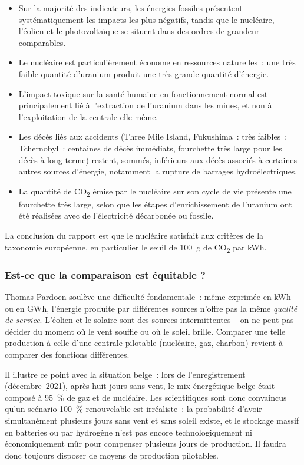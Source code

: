 \begin{itemize}
    \item Sur la majorité des indicateurs, les énergies fossiles présentent systématiquement les impacts les plus négatifs, tandis que le nucléaire, l'éolien et le photovoltaïque se situent dans des ordres de grandeur comparables.
    \item Le nucléaire est particulièrement économe en ressources naturelles~: une très faible quantité d'uranium produit une très grande quantité d'énergie.
    \item L'impact toxique sur la santé humaine en fonctionnement normal est principalement lié à l'extraction de l'uranium dans les mines, et non à l'exploitation de la centrale elle-même.
    \item Les décès liés aux accidents (Three Mile Island, Fukushima~: très faibles~; Tchernobyl~: centaines de décès immédiats, fourchette très large pour les décès à long terme) restent, sommés, inférieurs aux décès associés à certaines autres sources d'énergie, notamment la rupture de barrages hydroélectriques.
    \item La quantité de CO\textsubscript{2} émise par le nucléaire sur son cycle de vie présente une fourchette très large, selon que les étapes d'enrichissement de l'uranium ont été réalisées avec de l'électricité décarbonée ou fossile.
\end{itemize}

La conclusion du rapport est que le nucléaire satisfait aux critères de la taxonomie européenne, en particulier le seuil de 100~g de CO\textsubscript{2} par kWh.

\subsubsection{Est-ce que la comparaison est équitable ?}

Thomas Pardoen soulève une difficulté fondamentale~: même exprimée en kWh ou en GWh, l'énergie produite par différentes sources n'offre pas la même \emph{qualité de service}. L'éolien et le solaire sont des sources intermittentes -- on ne peut pas décider du moment où le vent souffle ou où le soleil brille. Comparer une telle production à celle d'une centrale pilotable (nucléaire, gaz, charbon) revient à comparer des fonctions différentes.

Il illustre ce point avec la situation belge~: lors de l'enregistrement (décembre~2021), après huit jours sans vent, le mix énergétique belge était composé à 95~\% de gaz et de nucléaire. Les scientifiques sont donc convaincus qu'un scénario 100~\% renouvelable est irréaliste~: la probabilité d'avoir simultanément plusieurs jours sans vent et sans soleil existe, et le stockage massif en batteries ou par hydrogène n'est pas encore technologiquement ni économiquement mûr pour compenser plusieurs jours de production. Il faudra donc toujours disposer de moyens de production pilotables.

